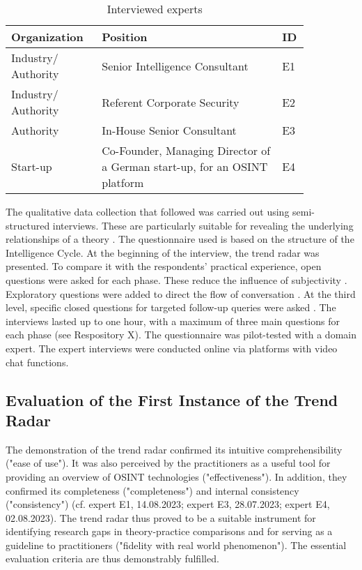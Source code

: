 \documentclass[10pt]{article}
\begin{document}
\begin{table}[htbp]
    \label{tab:experts}
    \caption{Interviewed experts}
    \begin{tabular}{|p{0.25\linewidth}|p{0.55\linewidth}|p{0.05\linewidth}|}
        \hline
        \textbf{Organization} & \textbf{Position}                                                         & \textbf{ID} \\
        \hline
        Industry/ Authority   & Senior Intelligence Consultant                                            & E1          \\
        \hline
        Industry/ Authority   & Referent Corporate Security                                               & E2          \\
        \hline
        Authority             & In-House Senior Consultant                                                & E3          \\
        \hline
        Start-up              & Co-Founder, Managing Director of a German start-up, for an OSINT platform & E4          \\
        \hline
    \end{tabular}
\end{table}

The qualitative data collection that followed was carried out using
semi-structured interviews. These are particularly suitable for
revealing the underlying relationships of a theory \cite{Bogner.2014}. The
questionnaire used is based on the structure of the Intelligence Cycle.
At the beginning of the interview, the trend radar was presented.
To compare it with the respondents' practical experience, open questions
were asked for each phase. These reduce the influence of
subjectivity \cite{Saunders.2012}. Exploratory questions were added to direct the flow of conversation
\cite{Saunders.2012}. At the third level, specific closed questions for targeted follow-up
queries were asked \cite{Saunders.2012}. The interviews lasted up to one hour, with a maximum of three
main questions for each phase \cite{Bogner.2014} (see Respository X). The questionnaire
was pilot-tested with a domain expert. The expert interviews were conducted online via
platforms with video chat functions.

\subsection{Evaluation of the First Instance of the Trend Radar}

The demonstration of the trend radar confirmed its intuitive
comprehensibility ("ease of use"). It was also perceived by the
practitioners as a useful tool for providing an overview of OSINT
technologies ("effectiveness"). In addition, they confirmed its
completeness ("completeness") and internal consistency ("consistency")
(cf. expert E1, 14.08.2023; expert E3, 28.07.2023; expert E4,
02.08.2023). The trend radar thus proved to be a
suitable instrument for identifying research gaps in theory-practice
comparisons and for serving as a guideline to practitioners
("fidelity with real world phenomenon"). The essential evaluation
criteria \cite{Sonnenberg.2012} are thus demonstrably fulfilled.
\end{document}
